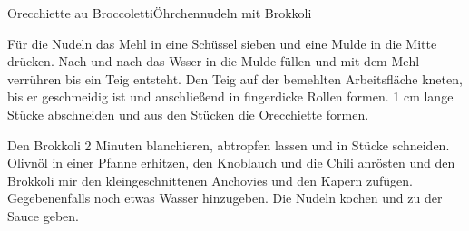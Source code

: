 \begin{recipe}{Orecchiette au Broccoletti}{Öhrchennudeln mit Brokkoli}
  \label{Orecchiette au Broccoletti}

  
  \steps
  Für die Nudeln das Mehl in eine Schüssel sieben und eine Mulde in die Mitte drücken.
  Nach und nach das Wsser in die Mulde füllen und mit dem Mehl verrühren bis ein Teig
  entsteht. Den Teig auf der bemehlten Arbeitsfläche kneten, bis er geschmeidig ist und
  anschließend in fingerdicke Rollen formen. 1 cm lange Stücke abschneiden und aus den
  Stücken die Orecchiette formen.

  Den Brokkoli 2 Minuten blanchieren, abtropfen lassen und in Stücke schneiden. Olivnöl in
  einer Pfanne erhitzen, den Knoblauch und die Chili anrösten und den Brokkoli mir den
  kleingeschnittenen Anchovies und den Kapern zufügen. Gegebenenfalls noch etwas Wasser
  hinzugeben. Die Nudeln kochen und zu der Sauce geben.
\end{recipe}
